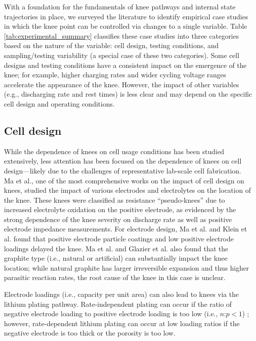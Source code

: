 \documentclass[journal=jpclcd,manuscript=article]{achemso}
\begin{document}
With a foundation for the fundamentals of knee pathways and internal state trajectories in place, we surveyed the literature to identify empirical case studies in which the knee point can be controlled via changes to a single variable. Table \ref{tab:experimental_summary} classifies these case studies into three categories based on the nature of the variable: cell design, testing conditions, and sampling/testing variability (a special case of these two categories). Some cell designs and testing conditions have a consistent impact on the emergence of the knee; for example, higher charging rates and wider cycling voltage ranges accelerate the appearance of the knee. However, the impact of other variables (e.g., discharging rate and rest times) is less clear and may depend on the specific cell design and operating conditions.

\subsection{Cell design}

While the dependence of knees on cell usage conditions has been studied extensively, less attention has been focused on the dependence of knees on cell design---likely due to the challenges of representative lab-scale cell fabrication. Ma et al.\cite{ma_editors_2019}{}, one of the most comprehensive works on the impact of cell design on knees, studied the impact of various electrodes and electrolytes on the location of the knee. These knees were classified as resistance ``pseudo-knees'' due to increased electrolyte oxidation on the positive electrode, as evidenced by the strong dependence of the knee severity on discharge rate as well as positive electrode impedance measurements. For electrode design, Ma et al.\cite{ma_editors_2019} and Klein et al.\cite{klein_demonstrating_2021} found that positive electrode particle coatings and low positive electrode loadings delayed the knee. Ma et al. \cite{ma_editors_2019} and Glazier et al.\cite{glazier_analysis_2017} also found that the graphite type (i.e., natural or artificial) can substantially impact the knee location; while natural graphite has larger irreversible expansion and thus higher parasitic reaction rates\cite{glazier_analysis_2017}{}, the root cause of the knee in this case is unclear.

Electrode loadings (i.e., capacity per unit area) can also lead to knees via the lithium plating pathway.
Rate-independent plating can occur if the ratio of negative electrode loading to positive electrode loading is too low (i.e., $n$:$p< 1$) \cite{deichmann_investigating_2020}; however, rate-dependent lithium plating can occur at low loading ratios if the negative electrode is too thick or the porosity is too low.\cite{waldmann_mechanical_2014, yang_modeling_2017, klein_demonstrating_2021}
\end{document}

